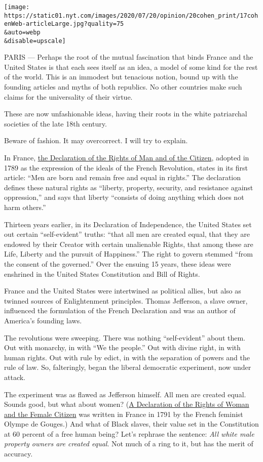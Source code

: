 \texttt{[image: https://static01.nyt.com/images/2020/07/20/opinion/20cohen\_print/17cohenWeb-articleLarge.jpg?quality=75\\\&auto=webp\\\&disable=upscale]}

PARIS --- Perhaps the root of the mutual fascination that binds France
and the United States is that each sees itself as an idea, a model of
some kind for the rest of the world. This is an immodest but tenacious
notion, bound up with the founding articles and myths of both republics.
No other countries make such claims for the universality of their
virtue.

These are now unfashionable ideas, having their roots in the white
patriarchal societies of the late 18th century.

Beware of fashion. It may overcorrect. I will try to explain.

In France,
\href{https://avalon.law.yale.edu/18th_century/rightsof.asp}{the
Declaration of the Rights of Man and of the Citizen}, adopted in 1789 as
the expression of the ideals of the French Revolution, states in its
first article: ``Men are born and remain free and equal in rights.'' The
declaration defines these natural rights as ``liberty, property,
security, and resistance against oppression,'' and says that liberty
``consists of doing anything which does not harm others.''

Thirteen years earlier, in its Declaration of Independence, the United
States set out certain ``self-evident'' truths: ``that all men are
created equal, that they are endowed by their Creator with certain
unalienable Rights, that among these are Life, Liberty and the pursuit
of Happiness.'' The right to govern stemmed ``from the consent of the
governed.'' Over the ensuing 15 years, these ideas were enshrined in the
United States Constitution and Bill of Rights.

France and the United States were intertwined as political allies, but
also as twinned sources of Enlightenment principles. Thomas Jefferson, a
slave owner, influenced the formulation of the French Declaration and
was an author of America's founding laws.

The revolutions were sweeping. There was nothing ``self-evident'' about
them. Out with monarchy, in with ``We the people.'' Out with divine
right, in with human rights. Out with rule by edict, in with the
separation of powers and the rule of law. So, falteringly, began the
liberal democratic experiment, now under attack.

The experiment was as flawed as Jefferson himself. All men are created
equal. Sounds good, but what about women?
(\href{https://www.bl.uk/collection-items/the-declaration-of-the-rights-of-woman-and-the-citizen}{A
Declaration of the Rights of Woman and the Female Citizen} was written
in France in 1791 by the French feminist Olympe de Gouges.) And what of
Black slaves, their value set in the Constitution at 60 percent of a
free human being? Let's rephrase the sentence: \emph{All white male
property owners are created equal}. Not much of a ring to it, but has
the merit of accuracy.

